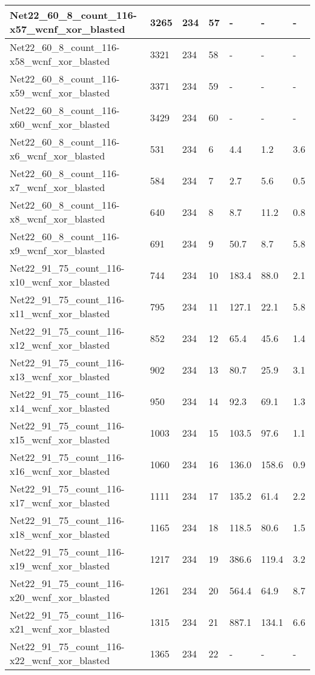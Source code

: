 \begin{scriptsize}
\begin{longtable}{|p{5cm}|l|l|l|l|l|l|}
Net22\_60\_8\_count\_116-x57\_wcnf\_xor\_blasted&3265&234&57&-&-&- \\ \hline 
Net22\_60\_8\_count\_116-x58\_wcnf\_xor\_blasted&3321&234&58&-&-&- \\ \hline 
Net22\_60\_8\_count\_116-x59\_wcnf\_xor\_blasted&3371&234&59&-&-&- \\ \hline 
Net22\_60\_8\_count\_116-x60\_wcnf\_xor\_blasted&3429&234&60&-&-&- \\ \hline 
Net22\_60\_8\_count\_116-x6\_wcnf\_xor\_blasted&531&234&6&4.4&1.2&3.6 \\ \hline 
Net22\_60\_8\_count\_116-x7\_wcnf\_xor\_blasted&584&234&7&2.7&5.6&0.5 \\ \hline 
Net22\_60\_8\_count\_116-x8\_wcnf\_xor\_blasted&640&234&8&8.7&11.2&0.8 \\ \hline 
Net22\_60\_8\_count\_116-x9\_wcnf\_xor\_blasted&691&234&9&50.7&8.7&5.8 \\ \hline 
Net22\_91\_75\_count\_116-x10\_wcnf\_xor\_blasted&744&234&10&183.4&88.0&2.1 \\ \hline 
Net22\_91\_75\_count\_116-x11\_wcnf\_xor\_blasted&795&234&11&127.1&22.1&5.8 \\ \hline 
Net22\_91\_75\_count\_116-x12\_wcnf\_xor\_blasted&852&234&12&65.4&45.6&1.4 \\ \hline 
Net22\_91\_75\_count\_116-x13\_wcnf\_xor\_blasted&902&234&13&80.7&25.9&3.1 \\ \hline 
Net22\_91\_75\_count\_116-x14\_wcnf\_xor\_blasted&950&234&14&92.3&69.1&1.3 \\ \hline 
Net22\_91\_75\_count\_116-x15\_wcnf\_xor\_blasted&1003&234&15&103.5&97.6&1.1 \\ \hline 
Net22\_91\_75\_count\_116-x16\_wcnf\_xor\_blasted&1060&234&16&136.0&158.6&0.9 \\ \hline 
Net22\_91\_75\_count\_116-x17\_wcnf\_xor\_blasted&1111&234&17&135.2&61.4&2.2 \\ \hline 
Net22\_91\_75\_count\_116-x18\_wcnf\_xor\_blasted&1165&234&18&118.5&80.6&1.5 \\ \hline 
Net22\_91\_75\_count\_116-x19\_wcnf\_xor\_blasted&1217&234&19&386.6&119.4&3.2 \\ \hline 
Net22\_91\_75\_count\_116-x20\_wcnf\_xor\_blasted&1261&234&20&564.4&64.9&8.7 \\ \hline 
Net22\_91\_75\_count\_116-x21\_wcnf\_xor\_blasted&1315&234&21&887.1&134.1&6.6 \\ \hline 
Net22\_91\_75\_count\_116-x22\_wcnf\_xor\_blasted&1365&234&22&-&-&- \\ \hline 

\end{longtable}
\end{scriptsize}
